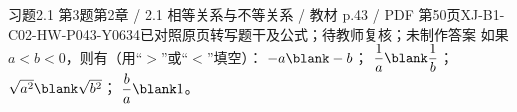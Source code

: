 \par\noindent\begin{minipage}{\linewidth}
\begin{bankitem}{习题2.1 第3题}{第2章 / 2.1 相等关系与不等关系 / 教材 p.43 / PDF 第50页}{XJ-B1-C02-HW-P043-Y0634}{已对照原页转写题干及公式；待教师复核；未制作答案}
如果 $a<b<0$，则有（用“$>$”或“$<$”填空）：
$-a\blank-b$；
$\dfrac1a\blank\dfrac1b$；
$\sqrt{a^2}\blank\sqrt{b^2}$；
$\dfrac ba\blank1$。
\end{bankitem}
\end{minipage}\par\medskip
